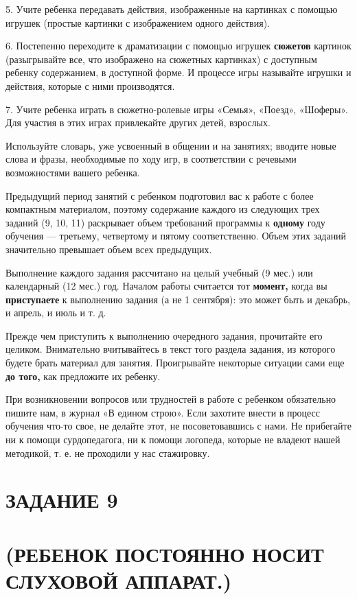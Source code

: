 \documentclass[a5paper]{book}
\newcounter{structure}
\begin{document}
5. Учите ребенка передавать действия, изображенные на картинках с
помощью игрушек (простые картинки с изображением одного действия).

6. Постепенно переходите к драматизации с помощью игрушек
\textbf{сюжетов} картинок (разыгрывайте все, что изображено на сюжетных
картинках) с доступным ребенку содержанием, в доступной форме. И
процессе игры называйте игрушки и действия, которые с ними производятся.

7. Учите ребенка играть в сюжетно-ролевые игры «Семья», «Поезд»,
«Шоферы». Для участия в этих играх привлекайте других детей, взрослых.

Используйте словарь, уже усвоенный в общении и на занятиях; вводите
новые слова и фразы, необходимые по ходу игр, в соответствии с речевыми
возможностями вашего ребенка.


Предыдущий период занятий с ребенком подготовил вас к работе с более
компактным материалом, поэтому содержание каждого из следующих трех
заданий (9, 10, 11) раскрывает объем требований программы к
\textbf{одному} году обучения --- третьему, четвертому и пятому
соответственно. Объем этих заданий значительно превышает объем всех
предыдущих.

Выполнение каждого задания рассчитано на целый учебный (9 мес.) или
календарный (12 мес.) год. Началом работы считается тот \textbf{момент,}
когда вы \textbf{приступаете} к выполнению задания (а не 1 сентября):
это может быть и декабрь, и апрель, и июль и т. д.

Прежде чем приступить к выполнению очередного задания, прочитайте его
целиком. Внимательно вчитывайтесь в текст того раздела задания, из
которого будете брать материал для занятия. Проигрывайте некоторые
ситуации сами еще \textbf{до того,} как предложите их ребенку.

При возникновении вопросов или трудностей в работе с ребенком
обязательно пишите нам, в журнал «В едином строю». Если захотите внести
в процесс обучения что-то свое, не делайте этот, не посоветовавшись с
нами. Не прибегайте ни к помощи сурдопедагога, ни к помощи логопеда,
которые не владеют нашей методикой, т. е. не проходили у нас стажировку.

\section{ЗАДАНИЕ 9}\section*{(РЕБЕНОК ПОСТОЯННО НОСИТ СЛУХОВОЙ АППАРАТ.)}
\end{document}
